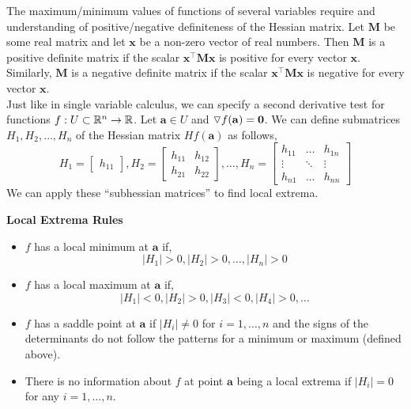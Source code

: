 \documentclass[12pt]{article}
\begin{document}
 The maximum/minimum values of functions of several variables require and understanding of positive/negative definiteness of the Hessian matrix. Let $\mathbf{M}$ be some real matrix and let $\mathbf{x}$ be a non-zero vector of real numbers. Then $\mathbf{M}$ is a positive definite matrix if the scalar $\mathbf{x}^\top\mathbf{M}\mathbf{x}$ is positive for every vector $\mathbf{x}$. Similarly, $\mathbf{M}$ is a negative definite matrix if the scalar $\mathbf{x}^\top\mathbf{M}\mathbf{x}$ is negative for every vector $\mathbf{x}$. \\

 Just like in single variable calculus, we can specify a second derivative test for functions $f:U\subset\mathbb{R}^n\rightarrow\mathbb{R}$. Let $\mathbf{a}\in U$ and $\triangledown f(\mathbf{a})=\mathbf{0}$. We can define submatrices $H_1,H_2,\ldots,H_n$ of the Hessian matrix $Hf(\mathbf{a})$ as follows,
\[
H_1 = 
\begin{bmatrix}
h_{11}
\end{bmatrix},
H_2 = 
\begin{bmatrix}
h_{11} & h_{12} \\
h_{21} & h_{22}
\end{bmatrix},
\ldots,
H_n = 
\begin{bmatrix}
h_{11} & \ldots & h_{1n} \\
\vdots & \ddots & \vdots \\
h_{n1} & \ldots & h_{nn}
\end{bmatrix}
\] 
We can apply these ``subhessian matrices'' to find local extrema.

\begin{framed}
\textbf{Local Extrema Rules}
\begin{itemize}
\item $f$ has a local minimum at $\mathbf{a}$ if,
\[
|H_1| >0, |H_2| >0, \ldots, |H_n| >0
\]
\item $f$ has a local maximum at $\mathbf{a}$ if,
\[
|H_1| <0, |H_2| >0, |H_3| <0, |H_4| >0, \ldots
\]
\item $f$ has a saddle point at $\mathbf{a}$ if $|H_i|\neq0$ for $i=1,\ldots,n$ and the signs of the determinants do not follow the patterns for a minimum or maximum (defined above). 
\item There is no information about $f$ at point $\mathbf{a}$ being a local extrema if $|H_i|=0$ for any $i=1,\ldots,n$.
\end{itemize}
\end{framed}
\end{document}
